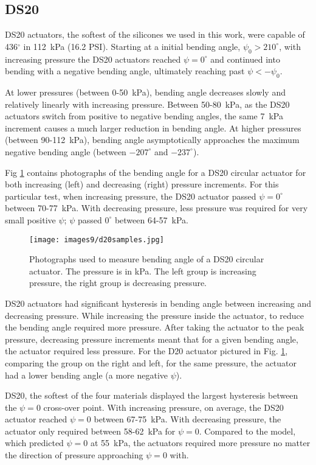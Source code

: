 \clearpage  
\subsection{DS20}

DS20 actuators, the softest of the silicones we used in this work, were capable of 436$^\circ$ in 112~kPa (16.2 PSI). Starting at a initial bending angle, $\psi_0>210^\circ$, with increasing pressure the DS20 actuators reached $\psi=0^\circ$ and continued into bending with a negative bending angle, ultimately reaching past $\psi<-\psi_0$. 

At lower pressures (between 0-50~kPa), bending angle decreases slowly and relatively linearly with increasing pressure. Between 50-80~kPa, as the DS20 actuators switch from positive to negative bending angles, the same 7~kPa increment causes a much larger reduction in bending angle. At higher pressures (between 90-112~kPa), bending angle asymptotically approaches the maximum negative bending angle (between $-207^\circ$ and $-237^\circ$). 

Fig \ref{fig:d20samples} contains photographs of the bending angle for a DS20 circular actuator for both increasing (left) and decreasing (right) pressure increments. For this particular test, when increasing pressure, the DS20 actuator passed $\psi=0^\circ$ between 70-77~kPa. With decreasing pressure, less pressure was required for very small positive $\psi$; $\psi$ passed $0^\circ$ between 64-57~kPa. 

\begin{figure}[ht]
    \centering
     \texttt{[image: images9/d20samples.jpg]}
    \caption{Photographs used to measure bending angle of a DS20 circular actuator. The pressure is in kPa. The left group is increasing pressure, the right group is decreasing pressure.}
    \label{fig:d20samples}
\end{figure}

DS20 actuators had significant hysteresis in bending angle between increasing and decreasing pressure. While increasing the pressure inside the actuator, to reduce the bending angle required more pressure. After taking the actuator to the peak pressure, decreasing pressure increments meant that for a given bending angle, the actuator required less pressure. For the D20 actuator pictured in Fig. \ref{fig:d20samples}, comparing the group on the right and left, for the same pressure, the actuator had a lower bending angle (a more negative $\psi$).  

DS20, the softest of the four materials displayed the largest hysteresis between the $\psi=0$ cross-over point. With increasing pressure, on average, the DS20 actuator reached $\psi=0$ between 67-75~kPa. With decreasing pressure, the actuator only required between 58-62~kPa for $\psi=0$. Compared to the model, which predicted $\psi=0$ at 55~kPa, the actuators required more pressure no matter the direction of pressure approaching $\psi=0$ with. 

